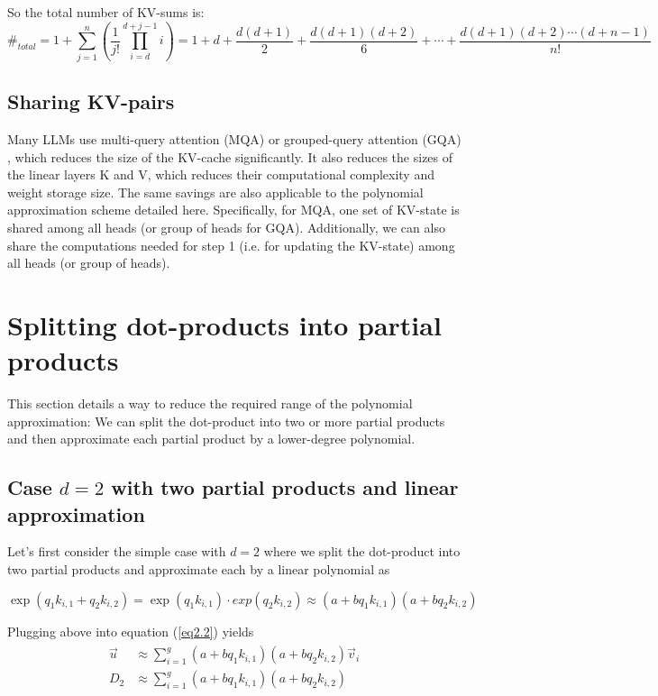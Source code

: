 \documentclass{article}
\numberwithin{equation}{section} %
\def\v{\vec{v}}
\def\u{\vec{u}}
\begin{document}
So the total number of KV-sums is:
\begin{equation}
  \#_{total} = 1 + \sum_{j=1}^n \left( \frac{1}{j!} \prod_{i=d}^{d+j-1} i \right)
  = 1 + d + \frac{d(d+1)}{2} + \frac{d(d+1)(d+2)}{6} + \cdots
  + \frac{d(d+1)(d+2) \cdots (d+n-1)}{n!}
\label{eq5.10} \end{equation}

\subsection{Sharing KV-pairs}
Many LLMs use multi-query attention (MQA) \citep{MQA} or grouped-query attention (GQA) \citep{GQA}, which reduces the size of the KV-cache significantly. It also reduces the sizes of the linear layers K and V, which reduces their computational complexity and weight storage size.
The same savings are also applicable to the polynomial approximation scheme detailed here. Specifically, for MQA, one set of KV-state is shared among all heads (or group of heads for GQA). Additionally, we can also share the computations needed for step 1 (i.e. for updating the KV-state) among all heads (or group of heads).

\section{Splitting dot-products into partial products}
This section details a way to reduce the required range of the polynomial approximation: We can split the dot-product into two or more partial products and then approximate each partial product by a lower-degree polynomial.

\subsection{Case $d = 2$ with two partial products and linear approximation}
Let’s first consider the simple case with $d = 2$ where we split the dot-product into two partial products and approximate each by a linear polynomial as

\begin{equation}
  \exp(q_1 k_{i,1} + q_2 k_{i,2}) = \exp(q_1 k_{i,1}) \cdot exp(q_2 k_{i,2})
  \approx (a + b q_1 k_{i,1}) (a + b q_2 k_{i,2})
\end{equation}

Plugging above into equation (\ref{eq2.2}) yields
\begin{align} \begin{split}
  \u  &\approx \sum_{i=1}^g (a + b q_1 k_{i,1}) (a + b q_2 k_{i,2}) \v_i \\
  D_2 &\approx \sum_{i=1}^g (a + b q_1 k_{i,1}) (a + b q_2 k_{i,2})
\label{eq6.2} \end{split} \end{align}
\end{document}
